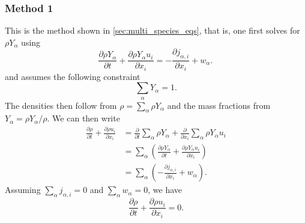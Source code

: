 \documentclass[oneside,a4paper,11pt]{report}
\begin{document}
\subsubsection{Method 1}
This is the method shown in \cref{sec:multi_species_eqs}, that is, one first solves for $\rho Y_\alpha$ using
\begin{equation*}
    \frac{\partial\rho Y_\alpha}{\partial t}+\frac{\partial \rho Y_\alpha u_i}{\partial x_i} = -\frac{\partial j_{\alpha,i}}{\partial x_i} + w_\alpha.\,
\end{equation*}
and assumes the following constraint
\begin{equation*}
    \sum_\alpha Y_\alpha = 1.
\end{equation*}
The densities then follow from $\rho = \sum_\alpha \rho Y_\alpha$ and the mass fractions from $Y_\alpha = \rho Y_\alpha / \rho$. We can then write
\begin{align*}
    \frac{\partial \rho}{\partial t} + \frac{\partial \rho u_i}{\partial x_i} &= \frac{\partial}{\partial t} \sum_\alpha \rho Y_\alpha + \frac{\partial}{\partial x_i} \sum_\alpha \rho Y_\alpha u_i \\
    &= \sum_\alpha \left( \frac{\partial \rho Y_\alpha}{\partial t} + \frac{\partial \rho Y_\alpha u_i}{\partial x_i} \right) \\
    &= \sum_\alpha \left( -\frac{\partial j_{\alpha,i}}{\partial x_i} + w_\alpha \right).
\end{align*}
Assuming $\sum_\alpha j_{\alpha,i} = 0$ and $\sum_\alpha w_\alpha = 0$, we have
\begin{equation*}
    \frac{\partial \rho}{\partial t} + \frac{\partial \rho u_i}{\partial x_i} = 0.
\end{equation*}
\end{document}
